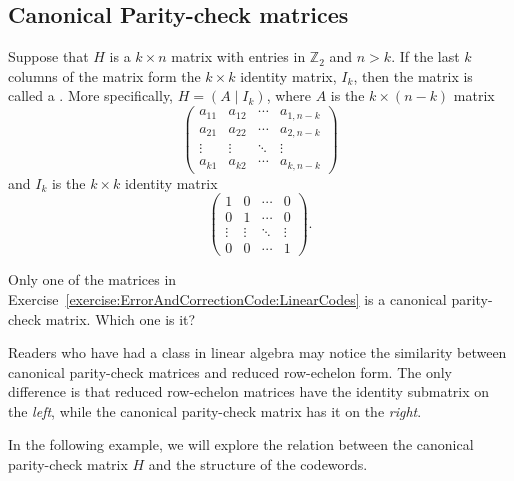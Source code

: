 \subsection{Canonical Parity-check matrices\quad
{}}
\label{subsec:ErrorAndCorrectionCode:EncodingBlockLinearCodes:ParityCheck}

\begin{defn}
  Suppose that $H$ is a $k \times n$ matrix with entries in
$\mathbb{Z}_2$ and $n > k$. If the last $k$ columns of the
matrix form the $k \times k$ identity matrix, $I_k$, then
the matrix is called a . More specifically, $H= (A \mid I_k
)$, where $A$ is the $k \times (n-k)$ matrix
\[
\left(
\begin{array}{cccc}
a_{11} & a_{12} & \cdots & a_{1,n-k} \\
a_{21} & a_{22} & \cdots & a_{2,n-k} \\
\vdots & \vdots & \ddots & \vdots    \\
a_{k1} & a_{k2} & \cdots & a_{k,n-k}
\end{array}
\right)
\]
and $I_k$ is the $k \times k$ identity matrix
\[
\left(
\begin{array}{cccc}
1 & 0 & \cdots & 0 \\
0 & 1 & \cdots & 0 \\
\vdots & \vdots & \ddots & \vdots \\
0 & 0 & \cdots & 1
\end{array}
\right).
\]
\end{defn}

\begin{exercise}{}
Only one of the matrices in Exercise~\ref{exercise:ErrorAndCorrectionCode:LinearCodes} is a canonical parity-check matrix. Which one is it?
\end{exercise}

Readers who have had a class in linear algebra may notice the similarity between canonical parity-check matrices and reduced row-echelon form. The only difference is that reduced row-echelon matrices have the identity submatrix on the \emph{left}, while the canonical parity-check matrix has it on the \emph{right}.

In the following example, we will explore the relation between the canonical parity-check matrix $H$ and the structure of the codewords.
 
